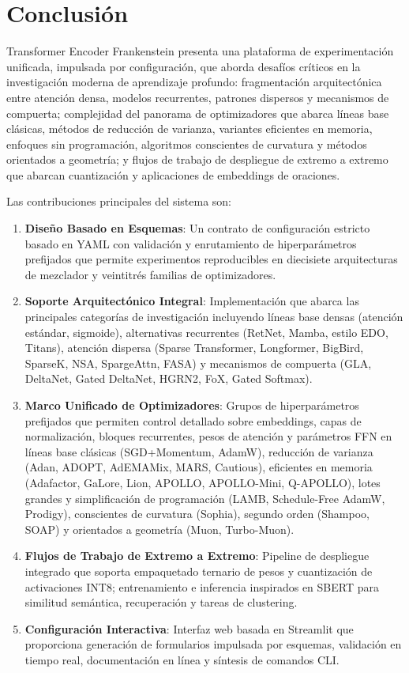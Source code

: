 \section{Conclusión}
\label{sec:conclusion}

Transformer Encoder Frankenstein presenta una plataforma de experimentación unificada, impulsada por configuración, que aborda desafíos críticos en la investigación moderna de aprendizaje profundo: fragmentación arquitectónica entre atención densa, modelos recurrentes, patrones dispersos y mecanismos de compuerta; complejidad del panorama de optimizadores que abarca líneas base clásicas, métodos de reducción de varianza, variantes eficientes en memoria, enfoques sin programación, algoritmos conscientes de curvatura y métodos orientados a geometría; y flujos de trabajo de despliegue de extremo a extremo que abarcan cuantización y aplicaciones de embeddings de oraciones.

Las contribuciones principales del sistema son:
\begin{enumerate}[leftmargin=*]
    \item \textbf{Diseño Basado en Esquemas}: Un contrato de configuración estricto basado en YAML con validación y enrutamiento de hiperparámetros prefijados que permite experimentos reproducibles en diecisiete arquitecturas de mezclador y veintitrés familias de optimizadores.
    \item \textbf{Soporte Arquitectónico Integral}: Implementación que abarca las principales categorías de investigación incluyendo líneas base densas (atención estándar, sigmoide), alternativas recurrentes (RetNet, Mamba, estilo EDO, Titans), atención dispersa (Sparse Transformer, Longformer, BigBird, SparseK, NSA, SpargeAttn, FASA) y mecanismos de compuerta (GLA, DeltaNet, Gated DeltaNet, HGRN2, FoX, Gated Softmax).
    \item \textbf{Marco Unificado de Optimizadores}: Grupos de hiperparámetros prefijados que permiten control detallado sobre embeddings, capas de normalización, bloques recurrentes, pesos de atención y parámetros FFN en líneas base clásicas (SGD+Momentum, AdamW), reducción de varianza (Adan, ADOPT, AdEMAMix, MARS, Cautious), eficientes en memoria (Adafactor, GaLore, Lion, APOLLO, APOLLO-Mini, Q-APOLLO), lotes grandes y simplificación de programación (LAMB, Schedule-Free AdamW, Prodigy), conscientes de curvatura (Sophia), segundo orden (Shampoo, SOAP) y orientados a geometría (Muon, Turbo-Muon).
    \item \textbf{Flujos de Trabajo de Extremo a Extremo}: Pipeline de despliegue integrado que soporta empaquetado ternario de pesos y cuantización de activaciones INT8; entrenamiento e inferencia inspirados en SBERT para similitud semántica, recuperación y tareas de clustering.
    \item \textbf{Configuración Interactiva}: Interfaz web basada en Streamlit que proporciona generación de formularios impulsada por esquemas, validación en tiempo real, documentación en línea y síntesis de comandos CLI.
\end{enumerate}


